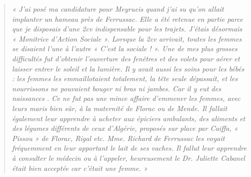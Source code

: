 \begin{quote}
\textit{« J’ai posé ma candidature pour Meyrueis quand j’ai su qu’on allait implanter un
hameau près de Ferrussac. Elle a été retenue en partie parce que je disposais d’une
2cv indispensable pour les trajets. J’étais désormais « Monitrice d’Action Sociale ».
Lorsque la 2cv arrivait, toutes les femmes se disaient l’une à l’autre « C’est la
sociale ! ».
Une de mes plus grosses difficultés fut d’obtenir l’ouverture des fenêtres et des volets
pour aérer et laisser entrer le soleil et la lumière. Il y avait aussi les soins pour les
bébés : les femmes les emmaillotaient totalement, la tête seule dépassait, et les
nourrissons ne pouvaient bouger ni bras ni jambes. Car il y eut des naissances . Ce
ne fut pas une mince affaire d’emmener les femmes, avec leurs maris bien sûr, à la
maternité de Florac ou de Mende. Il fallait également leur apprendre à acheter aux
épiciers ambulants, des aliments et des légumes différents de ceux d’Algérie,
proposés sur place par Caiffa, « Pissou » de Florac, Rigal etc. Mme. Richard de
Ferrussac les voyait fréquemment en leur apportant le lait de ses vaches.
Il fallut leur apprendre à consulter le médecin ou à l’appeler, heureusement le Dr.
Juliette Cabanel était bien acceptée car c’était une femme. »}
\end{quote}
